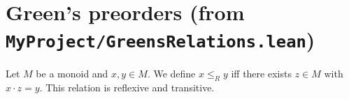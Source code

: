 

\section{Green's preorders (from \texttt{MyProject/GreensRelations.lean})}

\begin{definition}
  \label{def:RRel}
  Let \(M\) be a monoid and \(x,y\in M\).
  We define \(x \le_R y\) iff there exists \(z\in M\) with \(x\cdot z = y\).
  This relation is reflexive and transitive.
  \leanok
\end{definition}
